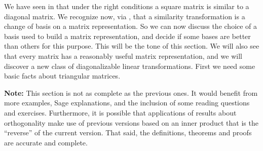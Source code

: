 %
%
\begin{introduction}
\begin{para}We have seen in  that under the right conditions a square matrix is similar to a diagonal matrix.  We recognize now, via , that a similarity transformation is a change of basis on a matrix representation.  So we can now discuss the choice of a basis used to build a matrix representation, and decide if some bases are better than others for this purpose.  This will be the tone of this section.  We will also see that every matrix has a reasonably useful matrix representation, and we will discover a new class of diagonalizable linear transformations.  First we need some basic facts about triangular matrices.\end{para}
%
\begin{para}{\bf Note:} This section is not as complete as the previous ones.  It would benefit from more examples, Sage explanations, and the inclusion of some reading questions and exercises.  Furthermore, it is possible that applications of results about orthogonality make use of previous versions based on an inner product that is the ``reverse'' of the current version.  That said, the definitions, theorems and proofs are accurate and complete.\end{para}
\end{introduction}
%
